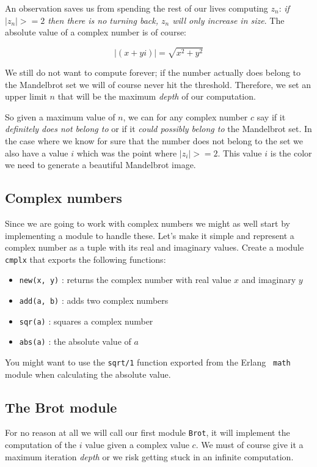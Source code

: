 \documentclass[a4paper,11pt]{article}
\begin{document}
An observation saves us from spending the rest of our lives computing
$z_n$: {\em if $|z_n| >= 2$ then there is no turning back, $z_n$ will
  only increase in size}. The absolute value of a complex number is of
course:

$$|(x + yi)| = \sqrt{x^2 + y^2}  $$

We still do not want to compute forever; if the number actually does
belong to the Mandelbrot set we will of course never hit the
threshold. Therefore, we set an upper limit $n$ that will be the
maximum {\em depth} of our computation.

So given a maximum value of $n$, we can for any complex number $c$ say
if it {\em definitely does not belong to} or if it {\em could possibly
  belong to} the Mandelbrot set. In the case where we know for sure
that the number does not belong to the set we also have a value $i$
which was the point where $|z_i| >= 2$. This value $i$ is the color we
need to generate a beautiful Mandelbrot image.


\subsection{Complex numbers}
Since we are going to work with complex numbers we might as well start
by implementing a module to handle these. Let's make it simple and
represent a complex number as a tuple with its real and imaginary
values. Create a module {\tt cmplx} that exports the following
functions:

\begin{itemize}
 \item {\tt new(x, y)} : returns the complex number with real value $x$ and imaginary $y$
 \item {\tt add(a, b)} : adds two complex numbers
 \item {\tt sqr(a)} : squares a complex number
 \item {\tt abs(a)} : the absolute value of $a$
\end{itemize}

You might want to use the {\tt sqrt/1} function exported from the Erlang {\tt
  math} module when calculating the absolute value.
  

\subsection{The Brot module}

For no reason at all we will call our first module {\tt Brot}, it will
implement the computation of the $i$ value given a complex value
$c$. We must of course give it a maximum iteration {\em depth} or we
risk getting stuck in an infinite computation.
\end{document}
